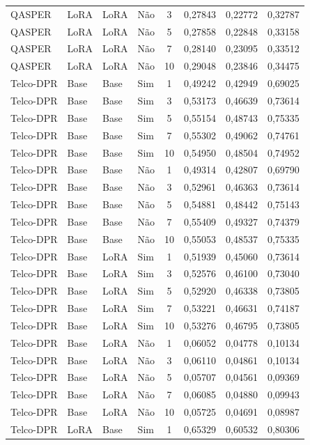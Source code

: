 \begin{longtable}{llllcccc}
QASPER & LoRA & LoRA & Não & 3 & 0,27843 & 0,22772 & 0,32787 \\
QASPER & LoRA & LoRA & Não & 5 & 0,27858 & 0,22848 & 0,33158 \\
QASPER & LoRA & LoRA & Não & 7 & 0,28140 & 0,23095 & 0,33512 \\
QASPER & LoRA & LoRA & Não & 10 & 0,29048 & 0,23846 & 0,34475 \\
Telco-DPR & Base & Base & Sim & 1 & 0,49242 & 0,42949 & 0,69025 \\
Telco-DPR & Base & Base & Sim & 3 & 0,53173 & 0,46639 & 0,73614 \\
Telco-DPR & Base & Base & Sim & 5 & 0,55154 & 0,48743 & 0,75335 \\
Telco-DPR & Base & Base & Sim & 7 & 0,55302 & 0,49062 & 0,74761 \\
Telco-DPR & Base & Base & Sim & 10 & 0,54950 & 0,48504 & 0,74952 \\
Telco-DPR & Base & Base & Não & 1 & 0,49314 & 0,42807 & 0,69790 \\
Telco-DPR & Base & Base & Não & 3 & 0,52961 & 0,46363 & 0,73614 \\
Telco-DPR & Base & Base & Não & 5 & 0,54881 & 0,48442 & 0,75143 \\
Telco-DPR & Base & Base & Não & 7 & 0,55409 & 0,49327 & 0,74379 \\
Telco-DPR & Base & Base & Não & 10 & 0,55053 & 0,48537 & 0,75335 \\
Telco-DPR & Base & LoRA & Sim & 1 & 0,51939 & 0,45060 & 0,73614 \\
Telco-DPR & Base & LoRA & Sim & 3 & 0,52576 & 0,46100 & 0,73040 \\
Telco-DPR & Base & LoRA & Sim & 5 & 0,52920 & 0,46338 & 0,73805 \\
Telco-DPR & Base & LoRA & Sim & 7 & 0,53221 & 0,46631 & 0,74187 \\
Telco-DPR & Base & LoRA & Sim & 10 & 0,53276 & 0,46795 & 0,73805 \\
Telco-DPR & Base & LoRA & Não & 1 & 0,06052 & 0,04778 & 0,10134 \\
Telco-DPR & Base & LoRA & Não & 3 & 0,06110 & 0,04861 & 0,10134 \\
Telco-DPR & Base & LoRA & Não & 5 & 0,05707 & 0,04561 & 0,09369 \\
Telco-DPR & Base & LoRA & Não & 7 & 0,06085 & 0,04880 & 0,09943 \\
Telco-DPR & Base & LoRA & Não & 10 & 0,05725 & 0,04691 & 0,08987 \\
Telco-DPR & LoRA & Base & Sim & 1 & 0,65329 & 0,60532 & 0,80306 \\

\end{longtable}
